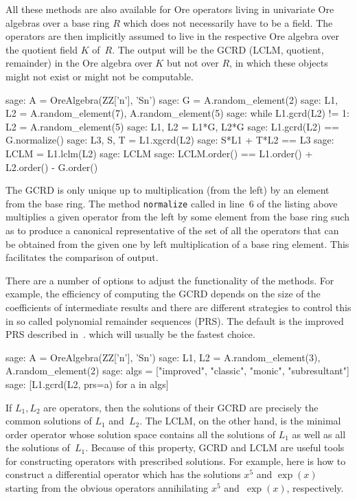 \documentclass[11pt]{amsart}
\begin{document}
All these methods are also available for Ore operators living in univariate Ore
algebras over a base ring $R$ which does not necessarily have to be a
field. The operators are then implicitly assumed to live in the respective Ore
algebra over the quotient field $K$ of~$R$. The output will be the
GCRD (LCLM, quotient, remainder) in the Ore algebra over $K$ but not over
$R$, in which these objects might not exist or might not be computable.

\begin{sageexample}
  sage: A = OreAlgebra(ZZ['n'], 'Sn')
  sage: G = A.random_element(2)
  sage: L1, L2 = A.random_element(7), A.random_element(5)
  sage: while L1.gcrd(L2) != 1: L2 = A.random_element(5)                       
  sage: L1, L2 = L1*G, L2*G                                                        
  sage: L1.gcrd(L2) == G.normalize()
  sage: L3, S, T = L1.xgcrd(L2)                             
  sage: S*L1 + T*L2 == L3
  sage: LCLM = L1.lclm(L2)
  sage: LCLM %
  sage: LCLM.order() == L1.order() + L2.order() - G.order()
\end{sageexample}

The GCRD is only unique up to multiplication (from the left) by an element from
the base ring. The method \verb|normalize| called in line~6 of the listing above
multiplies a given operator from the left by some element from the base ring
such as to produce a canonical representative of the set of all the operators
that can be obtained from the given one by left multiplication of a base ring
element. This facilitates the comparison of output.

There are a number of options to adjust the functionality of the methods. For
example, the efficiency of computing the GCRD depends on the size of the
coefficients of intermediate results and there are different strategies to
control this in so called polynomial remainder sequences (PRS). The default is
the improved PRS described in~\cite{jaroschek13b}. which will usually be the
fastest choice.

\begin{sageexample}
  sage: A = OreAlgebra(ZZ['n'], 'Sn')
  sage: L1, L2 = A.random_element(3), A.random_element(2)
  sage: algs = ["improved", "classic", "monic", "subresultant"]
  sage: [L1.gcrd(L2, prs=a) for a in algs]
\end{sageexample}

If $L_1,L_2$ are operators, then the solutions of their GCRD are precisely the
common solutions of $L_1$ and~$L_2$. The LCLM, on the other hand, is the minimal
order operator whose solution space contains all the solutions of $L_1$ as well
as all the solutions of~$L_1$. Because of this property, GCRD and LCLM are
useful tools for constructing operators with prescribed solutions. For example,
here is how to construct a differential operator which has the solutions $x^5$
and $\exp(x)$ starting from the obvious operators annihilating $x^5$
and~$\exp(x)$, respectively.
\end{document}
